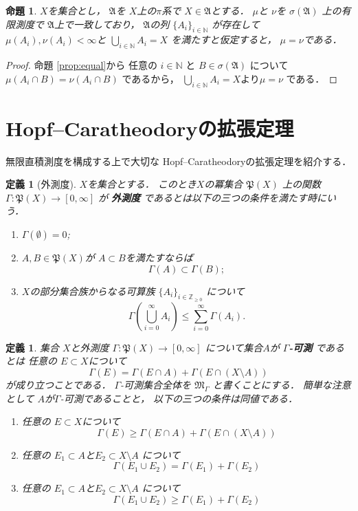 \documentclass[leqno, a4paper, 12pt]{jsarticle}
\newtheorem{prop}[thm]{命題}
\newtheorem{df}[thm]{定義}
\newcommand{\nn}{\mathbb{N}}
\newcommand{\zz}{\mathbb{Z}}
\begin{document}
\begin{prop}\label{prop:equal2}
$X$を集合とし，
$\mathfrak{A}$を
$X$上の$\pi$系で
$X\in \mathfrak{A}$とする．
$\mu$と
$\nu$を
$\sigma(\mathfrak{A})$
上の有限測度で
$\mathfrak{A}$上で一致しており，
$\mathfrak{A}$の列
$\{A_{i}\}_{i\in \nn}$
が存在して
$\mu(A_{i}), \nu(A_{i})<\infty$と
$\bigcup_{i\in \nn}A_{i}=X$
を満たすと仮定すると，
$\mu=\nu$である．
\end{prop}
\begin{proof}
命題 \ref{prop:equal}から
任意の
$i\in \nn$
と
$B\in \sigma(\mathfrak{A})$
について
$\mu(A_{i}\cap B)=\nu (A_{i}\cap B)$
であるから，
$\bigcup_{i\in \nn}A_{i}=X$より$\mu=\nu$
である．
\end{proof}


\section{Hopf--Caratheodoryの拡張定理}
無限直積測度を構成する上で大切な
Hopf--Caratheodoryの拡張定理を紹介する．
\begin{df}[外測度]
$X$を集合とする．
このとき$X$の冪集合
$\mathfrak{P}(X)$
上の関数
$\Gamma\colon \mathfrak{P}(X)\to [0, \infty]$
が
\textbf{外測度}
であるとは以下の三つの条件を満たす時にいう．
\begin{enumerate}
\item $\Gamma(\emptyset)=0$;
\item $A, B\in \mathfrak{P}(X)$が
$A\subset B$を満たすならば
\[
\Gamma(A)\subset \Gamma(B);
\]
\item 
$X$の部分集合族からなる可算族
$\{A_{i}\}_{i\in\zz_{\ge 0}}$
について
\[
\Gamma\left(\bigcup_{i=0}^{\infty}A_{i}\right)
\le \sum_{i=0}^{\infty}\Gamma(A_{i}). 
\]
\end{enumerate}
\end{df}

\begin{df}
集合
$X$と外測度
$\Gamma: \mathfrak{P}(X)\to [0, \infty]$
について集合$A$が
\textbf{$\Gamma$-可測}
であるとは
任意の
$E\subset X$について
\[
\Gamma(E)=\Gamma(E\cap A)+ \Gamma(E\cap (X\setminus A))
\]
が成り立つことである．
$\Gamma$-可測集合全体を
$\mathfrak{M}_{\Gamma}$
と書くことにする．
簡単な注意として
$A$が$\Gamma$-可測であることと，
以下の三つの条件は同値である．
\begin{enumerate}
\item 
任意の
$E\subset X$について
\[
\Gamma(E)\ge \Gamma(E\cap A)+ \Gamma(E\cap (X\setminus A))
\]
\item 
任意の
$E_{1}\subset A$と$E_{2}\subset X\setminus A$
について
\[
\Gamma(E_{1}\cup E_{2})=\Gamma(E_{1})+ \Gamma(E_{2})
\]

\item 
任意の
$E_{1}\subset A$と$E_{2}\subset X\setminus A$
について
\[
\Gamma(E_{1}\cup E_{2})\ge \Gamma(E_{1})+ \Gamma(E_{2})
\]

\end{enumerate}

\end{df}
\end{document}

